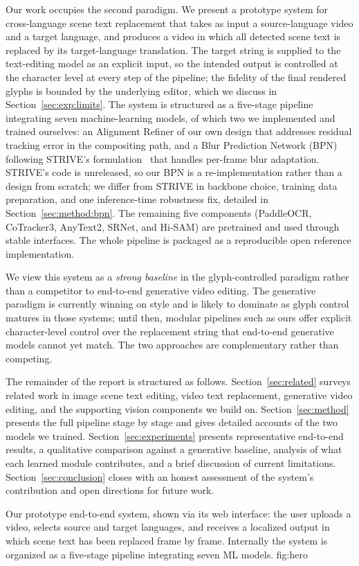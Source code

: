 Our work occupies the second paradigm. We present a prototype system
for cross-language scene text replacement that takes as input a
source-language video and a target language, and produces a video
in which all detected scene text is replaced by its target-language
translation. The target string is supplied to the text-editing
model as an explicit input, so the intended output is controlled at
the character level at every step of the pipeline; the fidelity of
the final rendered glyphs is bounded by the underlying editor, which
we discuss in Section~\ref{sec:exp:limits}. The system is structured
as a five-stage
pipeline integrating seven machine-learning models, of which two we
implemented and trained ourselves: an Alignment Refiner of our own
design that addresses residual tracking error in the compositing
path, and a Blur Prediction Network (BPN) following STRIVE's
formulation~\citep{subramanian2021strive} that handles per-frame
blur adaptation. STRIVE's code is unreleased, so our BPN is a
re-implementation rather than a design from scratch; we differ from
STRIVE in backbone choice, training data preparation, and one
inference-time robustness fix, detailed in
Section~\ref{sec:method:bpn}. The remaining five components
(PaddleOCR, CoTracker3, AnyText2, SRNet, and Hi-SAM) are pretrained
and used through stable interfaces. The
whole pipeline is packaged as a reproducible open reference
implementation.

We view this system as a \emph{strong baseline} in the
glyph-controlled paradigm rather than a competitor to end-to-end
generative video editing. The generative paradigm is currently
winning on style and is likely to dominate as glyph control matures
in those systems; until then, modular pipelines such as ours offer
explicit character-level control over the replacement string that
end-to-end generative models cannot yet match. The two approaches
are complementary rather than competing.

The remainder of the report is structured as follows.
Section~\ref{sec:related} surveys related work in image scene text
editing, video text replacement, generative video editing, and the
supporting vision components we build on.
Section~\ref{sec:method} presents the full pipeline stage by stage
and gives detailed accounts of the two models we trained.
Section~\ref{sec:experiments} presents representative end-to-end
results, a qualitative comparison against a generative baseline,
analysis of what each learned module contributes, and a brief
discussion of current limitations. Section~\ref{sec:conclusion}
closes with an honest assessment of the system's contribution and
open directions for future work.

%
  {Our prototype end-to-end system, shown via its web interface:
   the user uploads a video, selects source and target languages,
   and receives a localized output in which scene text has been
   replaced frame by frame. Internally the system is organized as a
   five-stage pipeline integrating seven ML models.}%
  {fig:hero}
